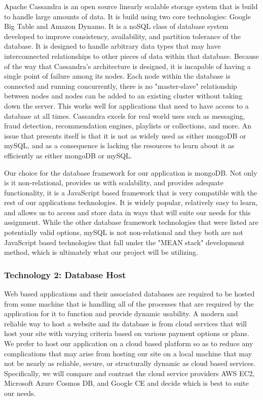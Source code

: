 		Apache Cassandra is an open source linearly scalable storage system that is build to handle large amounts of data. It is build using two core technologies: Google Big Table
		and Amazon Dynamo. It is a noSQL class of database system developed to improve consistency, availability, and partition tolerance of the database. It is designed
		to handle arbitrary data types that may have interconnected relationships to other pieces of data within that database. Because of the way that Cassandra's architecture 
		is designed, it is incapable of having a single point of failure among its nodes. Each node within the database is connected and running concurrently, there is no 
		"master-slave" relationship between nodes and nodes can be added to an existing cluster without taking down the server. This works well for applications that need to 
		have access to a database at all times. Cassandra excels for real world uses such as messaging, fraud detection, recommendation engines, playlists or collections, and more.
		An issue that presents itself is that it is not as widely used as either mongoDB or mySQL, and as a consequence is lacking the resources to learn about it as efficiently
		as either mongoDB or mySQL.
		
	
		Our choice for the database framework for our application is mongoDB. Not only is it non-relational, provides us with scalability, and provides adequate functionality, it is
		a JavaScript based framework that is very compatible with the rest of our applications technologies. It is widely popular, relatively easy to learn, and allows us
		to access and store data in ways that will suite our needs for this assignment. While the other database framework technologies that were listed are potentially valid options,
		mySQL is not non-relational and they both are not JavaScript based technologies that fall under the "MEAN stack" development method, which is ultimately what our project will be utilizing. 
		

\subsubsection{Technology 2: Database Host}

	Web based applications and their associated databases are required to be hosted from some machine that is handling all of the processes that are required by the application for it 
	to function and provide dynamic usability. A modern and reliable way to host a website and its database is from cloud services that will host your site with varying criteria
	based on various payment options or plans. We prefer to host our application on a cloud based platform so as to reduce any complications that may arise 
	from hosting our site on a local machine that may not be nearly as reliable, secure, or structurally dynamic as cloud based services. Specifically, we will
	compare and contrast the cloud service providers AWS EC2, Microsoft Azure Cosmos DB, and Google CE and decide which is best to suite our needs.
	
